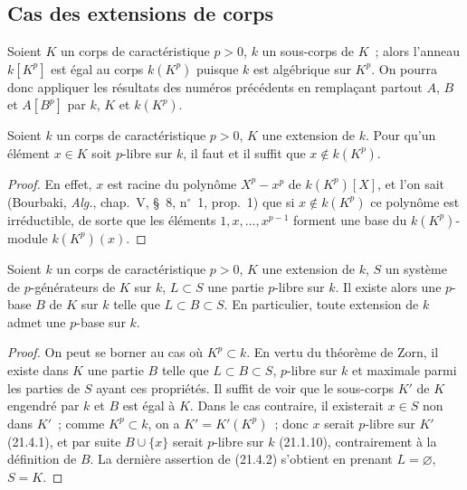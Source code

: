 \subsection{Cas des extensions de corps}
\label{0.21.4-fr}

\begin{env}[21.4.0]
\label{0.21.4.0-fr}
Soient $K$ un corps de caractéristique $p>0$, $k$ un sous-corps de $K$~;
alors l'anneau $k[K^p]$ est égal au corps $k(K^p)$ puisque $k$ est algébrique
sur $K^p$. On pourra donc appliquer les résultats des numéros précédents en
remplaçant partout $A$, $B$ et $A[B^p]$ par $k$, $K$ et $k(K^p)$.
\end{env}

\begin{lemma}[21.4.1]
\label{0.21.4.1-fr}
Soient $k$ un corps de caractéristique $p>0$, $K$ une extension de $k$.
Pour qu'un élément $x\in K$ soit $p$-libre sur $k$, il faut et il suffit que
$x\notin k(K^p)$.
\end{lemma}

\begin{proof}
En effet, $x$ est racine du polynôme $X^p-x^p$ de $k(K^p)[X]$, et l'on sait
(Bourbaki, \emph{Alg.}, chap.~V, §~8, n$^\circ$~1, prop.~1) que si
$x\notin k(K^p)$ ce polynôme est irréductible, de sorte que les éléments
$1,x,\ldots,x^{p-1}$ forment une base du $k(K^p)$-module $k(K^p)(x)$.
\end{proof}

\begin{theorem}[21.4.2]
\label{0.21.4.2-fr}
Soient $k$ un corps de caractéristique $p>0$, $K$ une extension de $k$,
$S$ un système de $p$-générateurs de $K$ sur $k$, $L\subset S$ une partie
$p$-libre sur $k$. Il existe alors une $p$-base $B$ de $K$ sur $k$ telle que
$L\subset B\subset S$. En particulier, toute extension de $k$ admet une
$p$-base sur $k$.
\end{theorem}

\begin{proof}
On peut se borner au cas où $K^p\subset k$. En vertu du théorème de Zorn,
il existe dans $K$ une partie $B$ telle que $L\subset B\subset S$, $p$-libre
sur $k$ et maximale parmi les parties de $S$ ayant ces propriétés. Il suffit
de voir que le sous-corps $K'$ de $K$ engendré par $k$ et $B$ est égal à $K$.
Dans le cas contraire, il existerait $x\in S$ non dans $K'$~; comme
$K^p\subset k$, on a $K'=K'(K^p)$~; donc $x$ serait $p$-libre sur $K'$
(21.4.1), et par suite $B\cup\{x\}$ serait $p$-libre sur $k$ (21.1.10),
contrairement à la définition de $B$. La dernière assertion de (21.4.2)
s'obtient en prenant $L=\varnothing$, $S=K$.
\end{proof}

